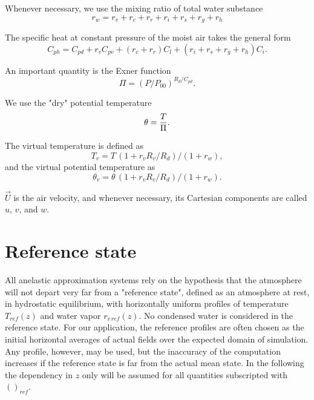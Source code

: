 Whenever necessary, we use the mixing ratio of total water substance
\begin{equation}
r_w=r_v+r_c+r_r+r_i+r_s+r_g+r_h
\end{equation}

The specific heat at constant pressure of the moist air takes the general form
\begin{equation}
C_{ph}=C_{pd}+r_v C_{pv} + (r_c+r_r) C_l + (r_i+r_s+r_g+r_h) C_i .
\end{equation}


An important quantity is the Exner function
\begin{equation}
\Pi  =  ( P/P_{00} )^{R_d / C_{pd}} .
\end{equation}

We use the "dry" potential temperature
\begin{equation}
\theta  =  {T \over \Pi}.
\end{equation}

The virtual temperature is defined as
\begin{equation}
T_v= T \, (1+r_v R_v/R_d)/(1+r_w),
\end{equation}
and the virtual potential temperature as
\begin{equation}
\theta_v= \theta \, (1+r_v R_v/R_d)/(1+r_w).
\end{equation}

$\vec{U}$ is the air velocity, and whenever necessary, its Cartesian
components are called $u$, $v$, and $w$.

\section{Reference state}

All anelastic approximation systems rely on the hypothesis
that the atmosphere will not depart very far from a "reference
 state", defined as
an atmosphere at rest, in hydrostatic equilibrium, with horizontally
uniform profiles of temperature $T_{ref}(z)$ and water vapor
$r_{v\,ref}(z)$. No condensed water is considered in the reference state.
For our application, the reference
profiles are often chosen as the initial horizontal averages of actual fields
 over the expected domain of
simulation. Any profile, however, may be used, but the inaccuracy of the
computation increases if the reference state is far from the actual mean state.
In the following the dependency in $z$ only will be assumed for all quantities
subscripted with $()_{ref}$.\\

